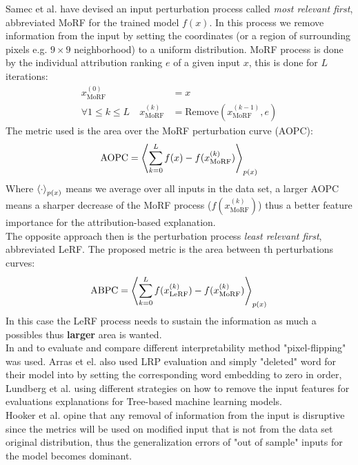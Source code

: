 \documentclass[12pt]{report}
\begin{document}
Samec et al. \cite{https://doi.org/10.48550/arxiv.1509.06321} have devised an input perturbation process called \textit{most relevant first}, abbreviated MoRF for the trained model $f(x)$. In this process we remove information from the input by setting the coordinates (or a region of surrounding pixels e.g. $9 \times 9$ neighborhood) to a uniform distribution. MoRF process is done by the individual attribution ranking $e$ of a given input $x$, this is done for $L$ iterations:
\begin{align*}
	x_{\text{MoRF}}^{(0)} & = x  \\ 
	\forall 1 \le k \le L \quad x_{\text{MoRF}}^{(k)} &= \text{Remove} (x_{\text{MoRF}}^{(k-1)}, e)	
\end{align*}
The metric used is the area over the MoRF perturbation curve (AOPC):
\begin{align*}
	\text{AOPC} = \Braket{	\sum_{k=0}^{L}f(x) -f(x_{\text{MoRF}}^{(k)})}_{p(x)}
\end{align*}
Where $\Braket{\cdot}_{p(x)}$ means we average over all inputs in the data set, a larger AOPC means a sharper decrease of the MoRF process ($f(x_{\text{MoRF}}^{(k)})$) thus a better feature importance for the attribution-based explanation. \\

The opposite approach then is the perturbation process \textit{least relevant first}, abbreviated LeRF. The proposed metric is the area between th perturbations curves:
\begin{align*}
	\text{ABPC} = \Braket{	\sum_{k=0}^{L}f(x_{\text{LeRF}}^{(k)}) -f(x_{\text{MoRF}}^{(k)})}_{p(x)}
\end{align*}
In this case the LeRF process needs to sustain the information as much a possibles thus \textbf{larger} area is wanted.\\

In \cite{DBLP:journals/corr/abs-2003-07631} and \cite{LRP} to evaluate and compare different interpretability method "pixel-flipping" was used.  Arras et el. \cite{DBLP:journals/corr/ArrasHMMS16a} also used LRP evaluation and simply "deleted" word for their model into by setting the corresponding word embedding to zero in order, Lundberg et al. using different strategies on how to remove the input features \cite{DBLP:journals/corr/abs-1905-04610} for evaluations explanations for Tree-based machine learning models. \\

Hooker et al.  \cite{https://doi.org/10.48550/arxiv.1806.10758} opine that any removal of information from the input is disruptive since the metrics will be used on modified input that is not from the data set original distribution, thus the generalization errors of "out of sample" inputs for the model becomes dominant. \\
\end{document}
